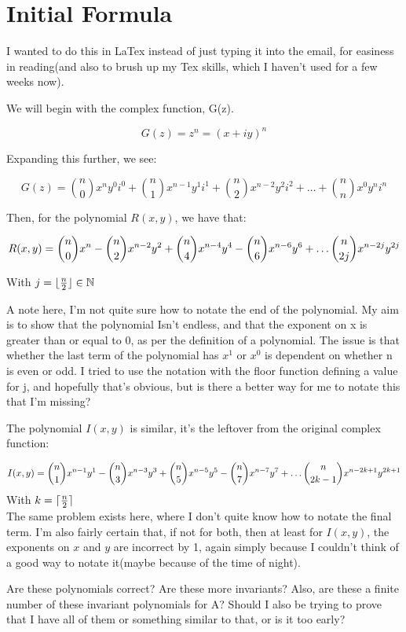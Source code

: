 \documentclass[12pt]{article}
\DeclarePairedDelimiter{\floor}{\lfloor}{\rfloor}
\DeclarePairedDelimiter{\ceil}{\lceil}{\rceil}
\begin{document}
\section*{Initial Formula}

I wanted to do this in LaTex instead of just typing it into the email, for easiness in reading(and also to brush up my Tex skills, which I haven't used for a few weeks now).

We will begin with the complex function, G(z).

\[ 
	G(z) = z^n = (x + iy)^n 
\]

Expanding this further, we see:

\[
       	G(z) =  \binom{n}{0} x^ny^0i^0 +\binom{n}{1} x^{n-1}y^1i^1 + \binom{n}{2} x^{n-2}y^2i^2 + \ldots + \binom{n}{n} x^0y^ni^n 
\]


Then, for the polynomial $R(x,y)$, we have that:

\[
	R(x,y) = \binom{n}{0}x^n - \binom{n}{2}x^{n-2}y^2 + \binom{n}{4}x^{n-4}y^4 - \binom{n}{6}x^{n-6}y^6 + \ldots \space \binom{n}{2j}x^{n-2j}y^{2j}
\]

       	 With $j = \floor{\frac{n}{2}} \in \mathbb{N}$ 

A note here, I'm not quite sure how to notate the end of the polynomial. My aim is to show that the polynomial Isn't endless, and that the exponent on x is greater than or equal to 0, as per the definition of a polynomial. The issue is that whether the last term of the polynomial has $x^1$ or $x^0$ is dependent on whether n is even or odd. I tried to use the notation with the floor function defining a value for j, and hopefully that's obvious, but is there a better way for me to notate this that I'm missing? 

The polynomial $I(x,y)$ is similar, it's the leftover from the original complex function:

\[
	I(x,y) = \binom{n}{1}x^{n-1}y^1 - \binom{n}{3}x^{n-3}y^3 + \binom{n}{5}x^{n-5}y^5 - \binom{n}{7}x^{n-7}y^7 + \ldots \space \binom{n}{2k-1}x^{n-2k+1}y^{2k+1}
\]
	With $k = \ceil[Bigg]{\frac{n}{2}} $  \\
The same problem exists here, where I don't quite know how to notate the final term. I'm also fairly certain that, if not for both, then at least for $I(x,y)$, the exponents on $x$ and $y$ are incorrect by 1, again simply because I couldn't think of a good way to notate it(maybe because of the time of night).

Are these polynomials correct? Are these more invariants? Also, are these a finite number of these invariant polynomials for A? Should I also be trying to prove that I have all of them or something similar to that, or is it too early? 
\end{document}
